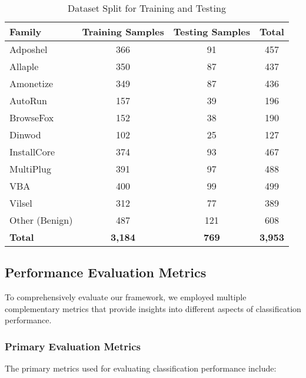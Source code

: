 \begin{table}[!htbp]
    \centering
    \caption{Dataset Split for Training and Testing}
    \label{tab:dataset-split}
    \begin{tabular}{|l|c|c|c|}
    \hline
    \textbf{Family} & \textbf{Training Samples} & \textbf{Testing Samples} & \textbf{Total} \\
    \hline
    Adposhel & 366 & 91 & 457 \\
    Allaple & 350 & 87 & 437 \\
    Amonetize & 349 & 87 & 436 \\
    AutoRun & 157 & 39 & 196 \\
    BrowseFox & 152 & 38 & 190 \\
    Dinwod & 102 & 25 & 127 \\
    InstallCore & 374 & 93 & 467 \\
    MultiPlug & 391 & 97 & 488 \\
    VBA & 400 & 99 & 499 \\
    Vilsel & 312 & 77 & 389 \\
    Other (Benign) & 487 & 121 & 608 \\
    \hline
    \textbf{Total} & \textbf{3,184} & \textbf{769} & \textbf{3,953} \\
    \hline
    \end{tabular}
\end{table}

\subsection{Performance Evaluation Metrics}
\label{subsec:evaluation-metrics}

To comprehensively evaluate our framework, we employed multiple complementary metrics that provide insights into different aspects of classification performance.

\subsubsection{Primary Evaluation Metrics}

The primary metrics used for evaluating classification performance include:

